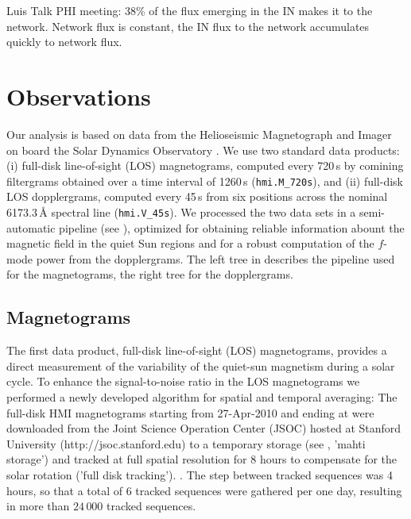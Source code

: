 \documentclass{aa}
\begin{document}
\cite[]{2019LRSP...16....1B}
Luis Talk PHI meeting: 38\% of the flux emerging in the IN makes it to the network. Network flux is constant, the IN flux to the network accumulates quickly to network flux.

\cite[]{2015ApJ...806..174J}

\cite[]{2013A&A...555A..33B}

\cite[]{2021arXiv210508657F}

\cite[]{2021arXiv210514533R}

\cite[]{ballot2021changes}


\section{Observations}

Our analysis is based on data from the Helioseismic Magnetograph and Imager \cite[HMI,][]{2012SoPh..275..207S,2012SoPh..275..229S} on board the Solar Dynamics Observatory \cite[SDO,][]{2012SoPh..275....3P}. We use two standard data products: (i) full-disk line-of-sight (LOS) magnetograms, computed every 720\,s by comining filtergrams obtained over a time interval of 1260\,s (\texttt{hmi.M\_720s}), and (ii) full-disk LOS dopplergrams, computed every 45\,s from six positions across the nominal 6173.3\,\AA{} spectral line (\texttt{hmi.V\_45s}). We processed the two data sets in a semi-automatic pipeline (see ), optimized for obtaining reliable information abount the magnetic field in the quiet Sun regions and for a robust computation of the $f$-mode power from the dopplergrams. The left tree in  describes the pipeline used for the magnetograms, the right tree for the dopplergrams.


\subsection{Magnetograms}

The first data product, full-disk line-of-sight (LOS) magnetograms, provides a direct measurement of the variability of the quiet-sun magnetism during a solar cycle. To enhance the signal-to-noise ratio in the LOS magnetograms we performed a newly developed algorithm for spatial and temporal averaging: The full-disk HMI magnetograms starting from 27-Apr-2010 and ending at  were downloaded from the Joint Science Operation Center (JSOC) hosted at Stanford University (http://jsoc.stanford.edu) to a temporary storage (see , 'mahti storage') and tracked at full spatial resolution for 8 hours to compensate for the solar rotation ('full disk tracking').
. 
The step between tracked sequences was 4 hours, so that a total of 6 tracked sequences were gathered per one day, resulting in more than $24\,000$ tracked sequences.
\end{document}
